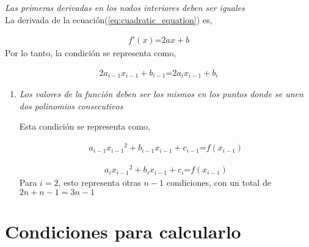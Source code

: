 \documentclass[conference]{IEEEtran}
\begin{document}
	\item \textit{Las primeras derivadas en los nodos interiores deben ser iguales} \\

	      La derivada de la ecuación(\ref{eq:cuadratic_equation}) es,

	      \begin{align*}
		      f'(x) \text{=} 2ax + b
	      \end{align*}
         Por lo tanto, la condición se representa como,

	      \begin{align}
		      2a_{i - 1}x_{i - 1} + b_{i - 1} \text{=} 2a_{i}x_{i - 1} + b_{i}
		      \label{eq:18.33}
	      \end{align}

\begin{enumerate}
	\item \textit{Los valores de la función deben ser los mismos en los puntos
		      donde se unen dos polinomios consecutivos}

	      Esta condición se representa como,

	      \begin{align}
		      a_{i - 1}{x_{i - 1}}^{2} + b_{i - 1}x_{i - 1} + c_{i - 1} \text{=} f(x_{i - 1})
		      \label{eq:18.29}
	      \end{align}

	      \begin{align}
		      a_{i}{x_{i - 1}}^{2} + b_{i}x_{i - 1} + c_{i} \text{=} f(x_{i - 1})
		      \label{eq:18.30}
	      \end{align}
Para $i = 2$, esto representa otras $n - 1$ condiciones, con
	      un total de $2n + n - 1 = 3n - 1$


       
\end{enumerate}

\section{Condiciones para calcularlo }
\end{document}
